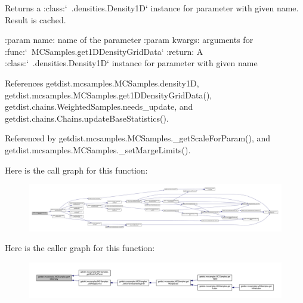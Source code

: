 \begin{DoxyVerb}Returns a :class:`~.densities.Density1D` instance for parameter with given name. Result is cached.

:param name: name of the parameter
:param kwargs: arguments for :func:`~MCSamples.get1DDensityGridData`
:return: A :class:`~.densities.Density1D` instance for parameter with given name
\end{DoxyVerb}
 

References getdist.\+mcsamples.\+M\+C\+Samples.\+density1D, getdist.\+mcsamples.\+M\+C\+Samples.\+get1\+D\+Density\+Grid\+Data(), getdist.\+chains.\+Weighted\+Samples.\+needs\+\_\+update, and getdist.\+chains.\+Chains.\+update\+Base\+Statistics().



Referenced by getdist.\+mcsamples.\+M\+C\+Samples.\+\_\+get\+Scale\+For\+Param(), and getdist.\+mcsamples.\+M\+C\+Samples.\+\_\+set\+Marge\+Limits().

Here is the call graph for this function\+:
\nopagebreak
\begin{figure}[H]
\begin{center}
\leavevmode
\includegraphics[width=350pt]{classgetdist_1_1mcsamples_1_1MCSamples_a67d8f66e8c759cac71fc3c0562faa74d_cgraph}
\end{center}
\end{figure}
Here is the caller graph for this function\+:
\nopagebreak
\begin{figure}[H]
\begin{center}
\leavevmode
\includegraphics[width=350pt]{classgetdist_1_1mcsamples_1_1MCSamples_a67d8f66e8c759cac71fc3c0562faa74d_icgraph}
\end{center}
\end{figure}
\mbox{\label{classgetdist_1_1mcsamples_1_1MCSamples_a53dc1a5889467700091389070326f0c9}} 
